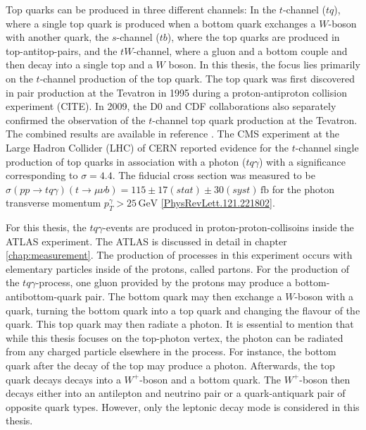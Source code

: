 Top quarks can be produced in three different channels: In the $t$-channel ($tq$), where a single top quark is produced when a bottom quark exchanges a $W$-boson with another quark, the $s$-channel ($tb$), where the top quarks are produced in top-antitop-pairs, and the $tW$-channel, where a gluon and a bottom couple and then decay into a single top and a $W$ boson. In this thesis, the focus lies primarily on the $t$-channel production of the top quark. 
The top quark was first discovered in pair production at the Tevatron in 1995 during a proton-antiproton collision experiment (CITE). In 2009, the D0 \cite{singletop1} and CDF \cite{singletop2} collaborations also separately confirmed the observation of the $t$-channel top quark production at the Tevatron. The combined results are available in reference \cite{singletop3}. 
The CMS experiment at the Large Hadron Collider (LHC) of CERN \cite{CMS} reported evidence for the $t$-channel single production of top quarks in association with a photon ($tq\gamma$) with a significance corresponding to $\sigma = 4.4$. The fiducial cross section 
was measured to be $\sigma(pp\rightarrow tq\gamma)(t\rightarrow\mu \nu b) = 115 \pm 17 (stat) \pm 30 (syst) \,\si{\femto\barn}$ for the photon transverse momentum $p_T^\gamma > 25 \,\si{\giga\electronvolt}$ \ref{PhysRevLett.121.221802}. 

For this thesis, the $tq\gamma$-events are produced in proton-proton-collisoins inside the ATLAS experiment. The ATLAS is discussed in detail in chapter \ref{chap:measurement}. The production of processes in this experiment occurs with elementary particles inside of the protons, called partons. For the production of the $tq\gamma$-process, one gluon provided by the protons may produce a bottom-antibottom-quark pair. The bottom quark may then exchange a $W$-boson with a quark, turning the bottom quark into a top quark and changing the flavour of the quark. This top quark may then radiate a photon. 
It is essential to mention that while this thesis focuses on the top-photon vertex, the photon can be radiated from any charged particle elsewhere in the process. For instance, the bottom quark after the decay of the top may produce a photon.
Afterwards, the top quark decays decays into a $W^+$-boson and a bottom quark. The $W^+$-boson then decays either into an antilepton and neutrino pair or a quark-antiquark pair of opposite quark types. However, only the leptonic decay mode is considered in this thesis.

